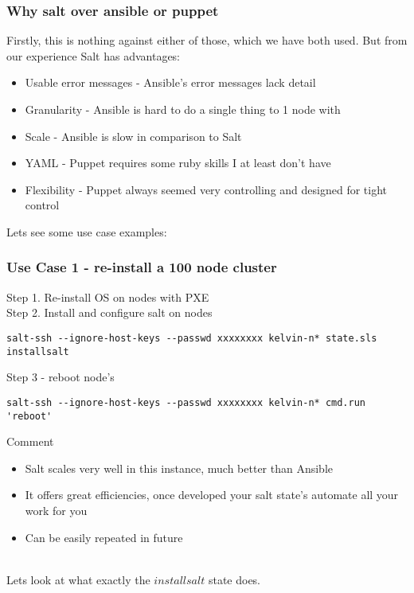 \documentclass{beamer}
\begin{document}
\begin{frame}
\frametitle{Why salt over ansible or puppet}
Firstly, this is nothing against either of those, which we have both used. But from our experience Salt has advantages:\\
\begin{itemize}
\item Usable error messages - Ansible's error messages lack detail
\item Granularity - Ansible is hard to do a single thing to 1 node with
\item Scale - Ansible is slow in comparison to Salt
\item YAML - Puppet requires some ruby skills I at least don't have
\item Flexibility - Puppet always seemed very controlling and designed for tight control
\end{itemize}

Lets see some use case examples:\\
\end{frame}

\begin{frame}[fragile] %
\frametitle{Use Case 1 - re-install a 100 node cluster}

Step 1. Re-install OS on nodes with PXE \\
Step 2. Install and configure salt on nodes\\
\begin{lstlisting}[basicstyle=\tiny,]
salt-ssh --ignore-host-keys --passwd xxxxxxxx kelvin-n* state.sls installsalt
\end{lstlisting}
Step 3 - reboot node's\\
\begin{lstlisting}[basicstyle=\tiny,]
salt-ssh --ignore-host-keys --passwd xxxxxxxx kelvin-n* cmd.run 'reboot' 
\end{lstlisting}
Comment\\
\begin{itemize}
\item Salt scales very well in this instance, much better than Ansible
\item It offers great efficiencies, once developed your salt state's automate all your work for you
\item Can be easily repeated in future\\~\\
\end{itemize}
Lets look at what exactly the $installsalt$ state does.
\end{frame}
\end{document}
